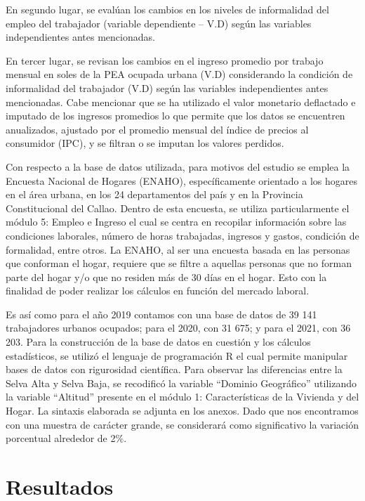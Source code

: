 \documentclass[
  letterpaper,
  12pt,
  oneside,
  spanish,
  doublespacing,
  headsepline,
  parskip]{MastersDoctoralThesis}
\begin{document}
En segundo lugar, se evalúan los cambios en los niveles de informalidad
del empleo del trabajador (variable dependiente -- V.D) según las
variables independientes antes mencionadas.

En tercer lugar, se revisan los cambios en el ingreso promedio por
trabajo mensual en soles de la PEA ocupada urbana (V.D) considerando la
condición de informalidad del trabajador (V.D) según las variables
independientes antes mencionadas. Cabe mencionar que se ha utilizado el
valor monetario deflactado e imputado de los ingresos promedios lo que
permite que los datos se encuentren anualizados, ajustado por el
promedio mensual del índice de precios al consumidor (IPC), y se filtran
o se imputan los valores perdidos.

Con respecto a la base de datos utilizada, para motivos del estudio se
emplea la Encuesta Nacional de Hogares (ENAHO), específicamente
orientado a los hogares en el área urbana, en los 24 departamentos del
país y en la Provincia Constitucional del Callao. Dentro de esta
encuesta, se utiliza particularmente el módulo 5: Empleo e Ingreso el
cual se centra en recopilar información sobre las condiciones laborales,
número de horas trabajadas, ingresos y gastos, condición de formalidad,
entre otros. La ENAHO, al ser una encuesta basada en las personas que
conforman el hogar, requiere que se filtre a aquellas personas que no
forman parte del hogar y/o que no residen más de 30 días en el hogar.
Esto con la finalidad de poder realizar los cálculos en función del
mercado laboral.

Es así como para el año 2019 contamos con una base de datos de 39 141
trabajadores urbanos ocupados; para el 2020, con 31 675; y para el 2021,
con 36 203. Para la construcción de la base de datos en cuestión y los
cálculos estadísticos, se utilizó el lenguaje de programación R el cual
permite manipular bases de datos con rigurosidad científica. Para
observar las diferencias entre la Selva Alta y Selva Baja, se recodificó
la variable ``Dominio Geográfico'' utilizando la variable ``Altitud''
presente en el módulo 1: Características de la Vivienda y del Hogar. La
sintaxis elaborada se adjunta en los anexos. Dado que nos encontramos
con una muestra de carácter grande, se considerará como significativo la
variación porcentual alrededor de 2\%.


\hypertarget{sec-resultados}{%
\chapter{Resultados}\label{sec-resultados}}
\end{document}
